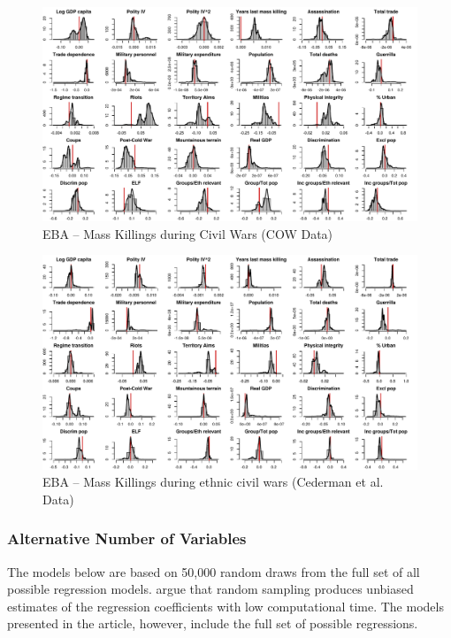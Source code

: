 \documentclass[a4paper,12pt]{article}
\begin{document}
\clearpage
\begin{figure}
    \centering
    \includegraphics[width=\textwidth]{images/mk-cow.pdf}
    \caption{EBA -- Mass Killings during Civil Wars (COW Data)}
    \label{fig:mk-cow}
\end{figure}
\clearpage

\clearpage
\begin{figure}
    \centering
    \includegraphics[width=\textwidth]{images/mk-eth.pdf}
    \caption{EBA -- Mass Killings during ethnic civil wars (Cederman et al. Data)}
    \label{fig:mk-eth}
\end{figure}
\clearpage

\subsubsection{Alternative Number of Variables}

The models below are based on 50,000 random draws from the full set of all possible regression models. \citet[819]{salaimartin2004determinants} argue that random sampling produces unbiased estimates of the regression coefficients with low computational time. The models presented in the article, however, include the full set of possible regressions.
\end{document}
